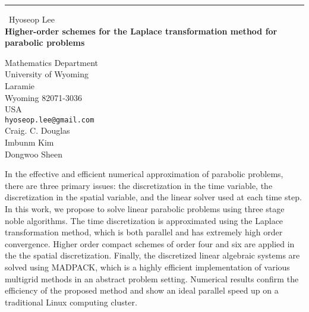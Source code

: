 \documentclass{report}
\begin{document}
\begin{center}
\rule{6in}{1pt} \
{\large Hyoseop Lee \\
{\bf Higher-order schemes for the Laplace transformation method for parabolic problems}}

Mathematics Department \\ University of Wyoming \\ Laramie \\ Wyoming 82071-3036 \\ USA
\\
{\tt hyoseop.lee@gmail.com}\\
Craig. C. Douglas\\
Imbunm Kim\\
Dongwoo Sheen\end{center}

In the effective and efficient numerical approximation of parabolic
problems, there are three primary issues: the discretization in the time
variable, the discretization in the spatial variable, and the linear
solver used at each time step. In this work, we propose to solve linear
parabolic problems using three stage noble algorithms. The time
discretization is approximated using the Laplace transformation method,
which is both parallel and has extremely high order convergence. Higher
order compact schemes of order four and six are applied in the the
spatial discretization. Finally, the discretized linear algebraic systems
are solved using MADPACK, which is a highly efficient implementation of
various multigrid methods in an abstract problem setting. Numerical
results confirm the efficiency of the proposed method and show an ideal
parallel speed up on a traditional Linux computing cluster.
\end{document}
